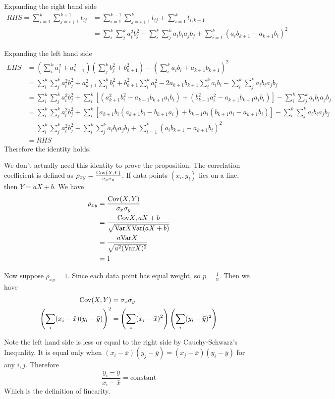 \documentclass[12pt]{article}
\begin{document}
Expanding the right hand side
$$\begin{aligned}
	RHS = \sum_{i=1}^{k}\sum_{j=i+1}^{k+1} t_{ij} &= \sum_{i=1}^{k-1}\sum_{j=i+1}^k t_{ij} + \sum_{i=1}^{k} t_{i, k+1} \\
	&= \sum_i^k \sum_j^k a_i^2  b_j^2 - \sum_i^k \sum_j^k a_ib_ia_jb_j + \sum_{i=1}^{k} (a_ib_{k+1} - a_{k+1}b_i)^2
\end{aligned}$$

Expanding the left hand side
$$\begin{aligned}
	LHS &= (\sum_i^k a_i^2 + a_{k+1}^2)(\sum_j^k b_j^2 + b_{k+1}^2) - \left(\sum_i^k a_ib_i + a_{k+1}b_{k+1}\right)^2 \\
	 &= \sum_i^k \sum_j^k a_i^2  b_j^2 + a_{k+1}^2 \sum_i^k b_i^2 + b_{k+1}^2 \sum_i^k a_i^2 - 2a_{k+1}b_{k+1} \sum_i^k a_ib_i - \sum_i^k \sum_j^k a_ib_ia_jb_j  \\
	 &= \sum_i^k \sum_j^k a_i^2  b_j^2 +  
	     \sum_i^k \left[(a_{k+1}^2 b_i^2 -a_{k+1}b_{k+1} a_ib_i)  + (b_{k+1}^2 a_i^2 - a_{k+1}b_{k+1} a_ib_i) \right] 
	     - \sum_i^k \sum_j^k a_ib_ia_jb_j \\
	 &= \sum_i^k \sum_j^k a_i^2 b_j^2+
	     \sum_i^k \left[a_{k+1}b_i(a_{k+1}b_i -b_{k+1} a_i) + b_{k+1}a_i(b_{k+1}a_i-a_{k+1}b_i)\right]
	     -\sum_i^k \sum_j^k a_ib_ia_jb_j \\
	 &= \sum_i^k \sum_j^k a_i^2  b_j^2 - \sum_i^k \sum_j^k a_ib_ia_jb_j + \sum_{i=1}^{k} (a_ib_{k+1} - a_{k+1}b_i)^2 \\
	 &= RHS
\end{aligned}
$$
Therefore the identity holds. 

We don't actually need this identity to prove the proposition.
The correlation coefficient is defined as $\rho_{xy}= \frac{\mathrm{Cov}(X, Y)}{\sigma_x \sigma_y}$. If data points $(x_i, y_i)$ lies on a line, then $Y = aX + b$. We have 
$$ \begin{aligned}
	\rho_{xy} &= \frac{\mathrm{Cov}(X, Y)}{\sigma_x \sigma_y}  \\
	 		  &= \frac{\mathrm{Cov}{X, aX + b}}{\sqrt{\mathrm{Var} X \mathrm{Var} (aX+b)}} \\
	 		  &= \frac{a \mathrm{Var} X }{\sqrt{a^2 (\mathrm{Var} X)^2}} \\
	 		  &= 1
\end{aligned}
$$

Now suppose $\rho_{xy}=1$. Since each data point has equal weight, so $p=\frac{1}{n}$. Then we have 
$$ \begin{aligned}
	\mathrm{Cov}(X, Y) &= \sigma_x \sigma_y \\
	\left( \sum_{i}(x_i -\bar{x})(y_i -\bar{y}) \right)^2 &= 
	\left( \sum_{i}(x_i -\bar{x})^2 \right) \left( \sum_{i}(y_i -\bar{y})^2 \right)
\end{aligned}$$

Note the left hand side is less or equal to the right side by Cauchy-Schwarz's Inequality. It is equal only when $(x_i -\bar{x})(y_j-\bar{y}) = (x_j -\bar{x})(y_i -\bar{y})$ for any $i,j$.
Therefore 
$$  \frac{y_i -\bar{y}}{x_i -\bar{x}} = \mbox{constant} $$
Which is the definition of linearity.
\QED
\end{document}
